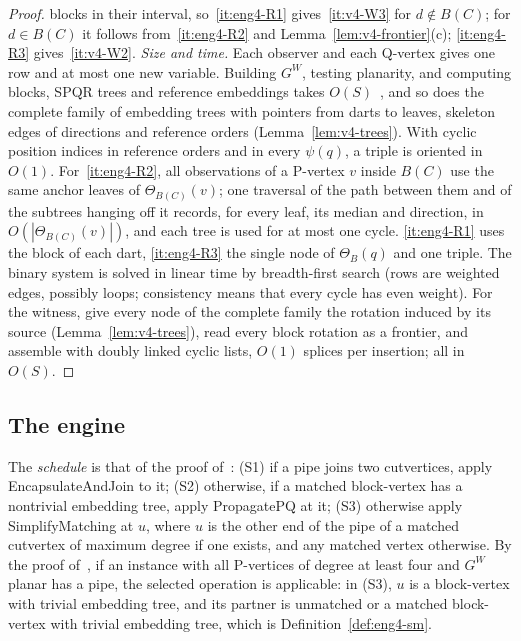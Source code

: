 \begin{proof}
blocks in their interval, so~\ref{it:eng4-R1} gives~\ref{it:v4-W3} for
$d\notin B(C)$; for $d\in B(C)$ it follows from~\ref{it:eng4-R2} and
Lemma~\ref{lem:v4-frontier}(c); \ref{it:eng4-R3} gives~\ref{it:v4-W2}.
\emph{Size and time.} Each observer and each Q-vertex gives one row and at
most one new variable. Building $G^W$, testing planarity, and computing
blocks, SPQR trees and reference embeddings takes
$O(S)$~\cite{HT74,Tar72,HT73,GM01}, and so does the complete family of
embedding trees with pointers from darts to leaves, skeleton edges of
directions and reference orders (Lemma~\ref{lem:v4-trees}). With cyclic
position indices in reference orders and in every $\psi(q)$, a triple is
oriented in $O(1)$. For~\ref{it:eng4-R2}, all observations of a P-vertex $v$
inside $B(C)$ use the same anchor leaves of $\Theta_{B(C)}(v)$; one traversal
of the path between them and of the subtrees hanging off it records, for
every leaf, its median and direction, in $O(|\Theta_{B(C)}(v)|)$, and each
tree is used for at most one cycle. \ref{it:eng4-R1} uses the block of each
dart, \ref{it:eng4-R3} the single node of $\Theta_B(q)$ and one triple. The
binary system is solved in linear time by breadth-first search (rows are
weighted edges, possibly loops; consistency means that every cycle has even
weight). For the witness, give every node of the complete family the
rotation induced by its source (Lemma~\ref{lem:v4-trees}), read every block
rotation as a frontier, and assemble with doubly linked cyclic lists, $O(1)$
splices per insertion; all in $O(S)$.
\end{proof}

\subsection{The engine}\label{sec:eng4-main}

The \emph{schedule} is that of the proof of~\cite[Lemma~7]{BFR21}: (S1) if a
pipe joins two cutvertices, apply EncapsulateAndJoin to it; (S2) otherwise,
if a matched block-vertex has a nontrivial embedding tree, apply PropagatePQ
at it; (S3) otherwise apply SimplifyMatching at $u$, where $u$ is the other
end of the pipe of a matched cutvertex of maximum degree if one exists, and
any matched vertex otherwise. By the proof of~\cite[Lemma~7]{BFR21}, if an
instance with all P-vertices of degree at least four and $G^W$ planar has a
pipe, the selected operation is applicable: in (S3), $u$ is a block-vertex
with trivial embedding tree, and its partner is unmatched or a matched
block-vertex with trivial embedding tree, which is
Definition~\ref{def:eng4-sm}.

